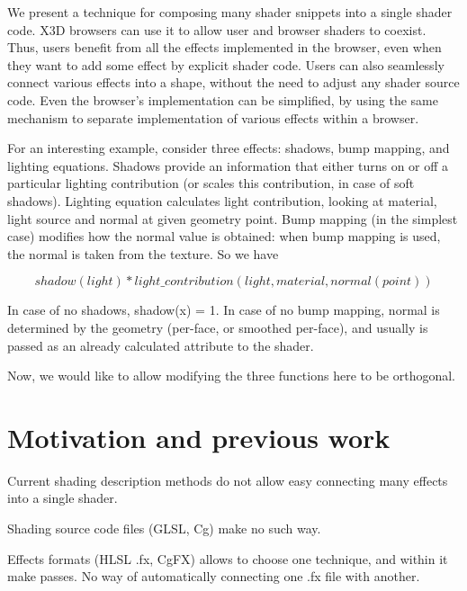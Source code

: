 \documentclass{acmsiggraph}                     %
\begin{document}
\copyrightspace

We present a technique for composing many shader snippets into a
single shader code. X3D browsers can use it to allow user and browser
shaders to coexist. Thus, users benefit from all the effects
implemented in the browser, even when they want to add some effect by
explicit shader code. Users can also seamlessly connect various
effects into a shape, without the need to adjust any shader source
code. Even the browser's implementation can be simplified, by using
the same mechanism to separate implementation of various effects
within a browser.

For an interesting example, consider three effects: shadows, bump
mapping, and lighting equations. Shadows provide an information that
either turns on or off a particular lighting contribution (or scales
this contribution, in case of soft shadows). Lighting equation
calculates light contribution, looking at material, light source and
normal at given geometry point. Bump mapping (in the simplest case)
modifies how the normal value is obtained: when bump mapping is used,
the normal is taken from the texture. So we have

$$  shadow(light) * light\_contribution(light, material, normal(point)) $$

In case of no shadows, shadow(x) = 1. In case of no bump mapping,
normal is determined by the geometry (per-face, or smoothed per-face),
and usually is passed as an already calculated attribute to the
shader.

Now, we would like to allow modifying the three functions here to be
orthogonal.

\section{Motivation and previous work}

Current shading description methods do not allow easy connecting
many effects into a single shader.

Shading source code files (GLSL, Cg) make no such way.

Effects formats (HLSL .fx, CgFX) allows to choose one technique, and
within it make passes. No way of automatically connecting one .fx file
with another.
\end{document}
